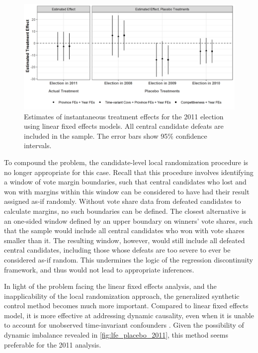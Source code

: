 \documentclass[12pt]{article}
\newcommand{\1}{\mathbbm{1}}
\begin{document}
\begin{figure}[!htbp]
	\centering
	\includegraphics[width=\textwidth]{figure/200202_lfe_placebo_2011.png}
	\captionsetup{singlelinecheck=off}
	\caption[Estimated placebo linear fixed effects treatment effects for 2011]{Estimates of instantaneous treatment effects for the 2011 election using linear fixed effects models. All central candidate defeats are included in the sample. The error bars show 95\% confidence intervals.}
	\label{fig:lfe_placebo_2011}
\end{figure}

To compound the problem, the candidate-level local randomization procedure is no longer appropriate for this case. Recall that this procedure involves identifying a window of vote margin boundaries, such that central candidates who lost and won with margins within this window can be considered to have had their result assigned as-if randomly. Without vote share data from defeated candidates to calculate margins, no such boundaries can be defined. The closest alternative is an one-sided window defined by an upper boundary on winners' vote shares, such that the sample would include all central candidates who won with vote shares smaller than it. The resulting window, however, would still include all defeated central candidates, including those whose defeats are too severe to ever be considered as-if random. This undermines the logic of the regression discontinuity framework, and thus would not lead to appropriate inferences.

In light of the problem facing the linear fixed effects analysis, and the inapplicability of the local randomization approach, the generalized synthetic control method \citep{Xu2017gsynth} becomes much more important. Compared to linear fixed effects model, it is more effective at addressing dynamic causality, even when it is unable to account for unobserved time-invariant confounders \autocite{ImaiKim2019}. Given the possibility of dynamic imbalance revealed in \autoref{fig:lfe_placebo_2011}, this method seems preferable for the 2011 analysis.
\end{document}
